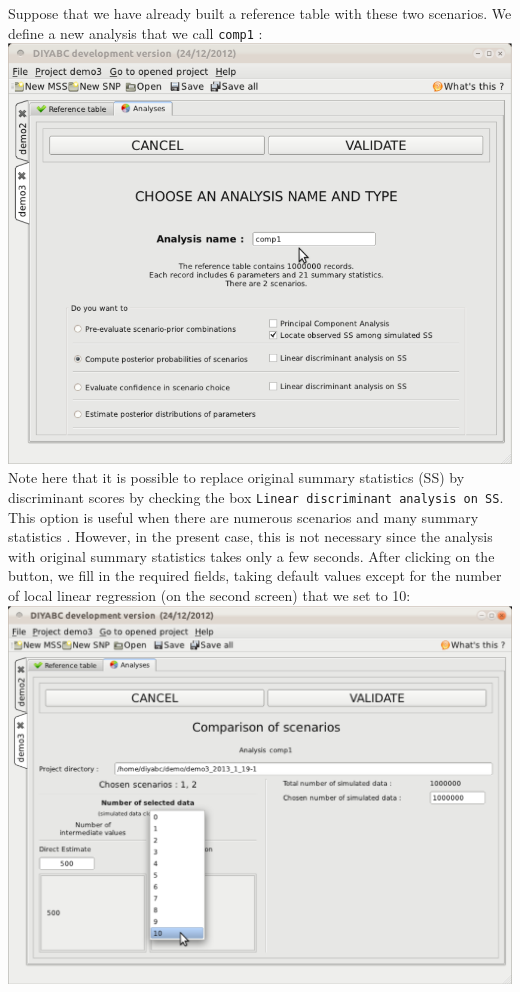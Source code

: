 Suppose that we have already built a reference table with these two scenarios. We define a new analysis that we call \texttt{comp1} :\\

\includegraphics[scale=0.33]{gui_pictures/Capture-DIYABC-105.png} \\
 
Note here that it is possible to replace original summary statistics (SS) by discriminant scores by checking the box \texttt{Linear discriminant analysis on SS}. This option is useful when there are numerous scenarios and many summary statistics \citep{EL2012}. However, in the present case, this is not necessary since the analysis with original summary statistics takes only a few seconds. After clicking on the  button, we fill in the required fields, taking default values except for the number of local linear regression (on the second screen) that we set to 10:\\

\includegraphics[scale=0.3]{gui_pictures/Capture-DIYABC-109.png} \\

